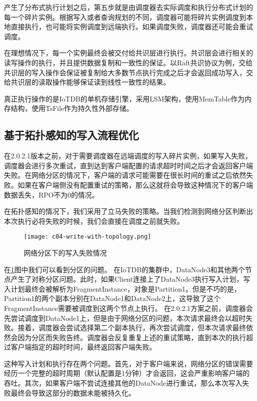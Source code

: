 产生了分布式执行计划之后，第五步就是由调度器去实际调度和执行分布式计划的每一个碎片实例。根据写入或者查询规划的不同，调度器可能将碎片实例调度到本地直接执行，也可能将实例调度到远端执行。如果调度失败，调度器还可能会重试调度。

在理想情况下，每一个实例最终会被交付给共识层进行执行。共识层会进行相关的读写操作的执行，并且提供数据复制和一致性的保证。以Raft共识协议为例，交给共识层的写入操作会保证被复制给大多数节点执行完成之后才会返回成功写入，交给共识层的读取操作能够保证读到线性一致性的结果。

真正执行操作的是IoTDB的单机存储引擎，采用LSM架构\cite{o1996lsmtree}，使用MemTable作为内存结构，使用TsFile\cite{zhao2024apachetsfile}作为持久性外部存储。

\subsection{基于拓扑感知的写入流程优化}

在2.0.2.1版本之前，对于需要调度器在远端调度的写入碎片实例，如果写入失败，调度器会进行多次重试，直到达到客户端配置的请求超时时间之后才会返回客户端失败。在网络分区的情况下，客户端的请求可能需要在很长时间的重试之后依然失败。如果在客户端侧没有配置重试的策略，那么这就将会导致这种情况下的客户端数据丢失，RPO不为0的情况。

在拓扑感知的情况下，我们采用了立马失败的策略。当我们检测到网络分区判断出本次执行必将失败的时候，我们会直接在调度之前就失败。

\begin{figure}
  \centering
  \texttt{[image: c04-write-with-topology.png]}
  \caption{网络分区下的写入失败情况}
  \label{fig:c04-write-with-topology}
\end{figure}

在\ref{fig:c04-write-with-topology}图中我们可以看到分区的问题。
在IoTDB的集群中，DataNode3和其他两个节点产生了对称分区问题。此时，如果Client连接上了DataNode3执行写入计划，写入计划最终会被解析为FragmentInstance，对象是Partition1。但是不巧的是，Partition1的两个副本分别在DataNode1和DataNode2上，这导致了这个FragmentInstance需要被调度到这两个节点上执行。
在2.0.2.1方案之前，调度器会先尝试调度到DataNode1上，但是由于网络分区的问题，本次请求最终会以超时失败。接着，调度器会尝试选择第二个副本执行，再次尝试调度，但本次请求最终依然会因为分区而失败告终。调度器会反复重复上述的重试策略，直到本次的执行超过客户端指定的超时时间，最终返回客户端失败。

这种写入计划和执行存在两个问题。首先，对于客户端来说，网络分区的错误需要经历一个完整的超时周期（默认配置是1分钟）才会返回，这会严重影响客户端的吞吐。其次，如果客户端不尝试连接其他的DataNode进行重试，那么本次写入失败最终会导致这部分的数据未能被持久化。


